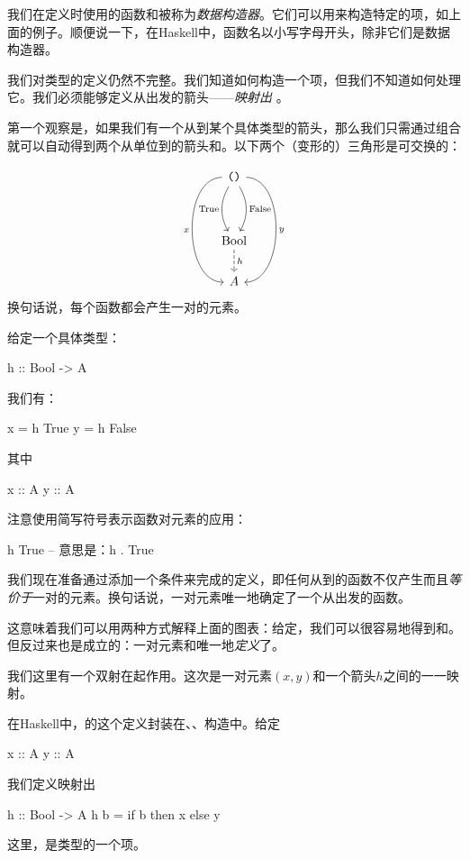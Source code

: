 \documentclass[DaoFP]{subfiles}
\begin{document}
我们在定义时使用的函数和被称为\emph{数据构造器}。它们可以用来构造特定的项，如上面的例子。顺便说一下，在Haskell中，函数名以小写字母开头，除非它们是数据构造器。

我们对类型的定义仍然不完整。我们知道如何构造一个项，但我们不知道如何处理它。我们必须能够定义从出发的箭头——\emph{映射出} 。

第一个观察是，如果我们有一个从到某个具体类型的箭头，那么我们只需通过组合就可以自动得到两个从单位到的箭头和。以下两个（变形的）三角形是可交换的：

\[
 \begin{tikzcd}
 \hask{()}
 \arrow[dd, bend right, "\text{True}"']
 \arrow[dd, bend left, "\text{False}"]
  \arrow[ddd, bend right =90, "x"']
 \arrow[ddd, bend left=90, "y"]
\\
 \\
\text{Bool}
\arrow[d, dashed, "h"]
\\
A
 \end{tikzcd}
\]
换句话说，每个函数都会产生一对的元素。

给定一个具体类型：
\begin{haskell}
h :: Bool -> A
\end{haskell}
我们有：
\begin{haskell}
x = h True
y = h False
\end{haskell}
其中
\begin{haskell}
x :: A
y :: A
\end{haskell}
注意使用简写符号表示函数对元素的应用：
\begin{haskell}
h True -- 意思是：h . True
\end{haskell}

我们现在准备通过添加一个条件来完成的定义，即任何从到的函数不仅产生而且\emph{等价于}一对的元素。换句话说，一对元素唯一地确定了一个从出发的函数。

这意味着我们可以用两种方式解释上面的图表：给定，我们可以很容易地得到和。但反过来也是成立的：一对元素和唯一地\emph{定义}了。

我们这里有一个双射在起作用。这次是一对元素$(x, y)$和一个箭头$h$之间的一一映射。

在Haskell中，的这个定义封装在、、构造中。给定
\begin{haskell}
x :: A
y :: A
\end{haskell}
我们定义映射出
\begin{haskell}
h :: Bool -> A
h b = if b then x else y
\end{haskell}
这里，是类型的一个项。
\end{document}
